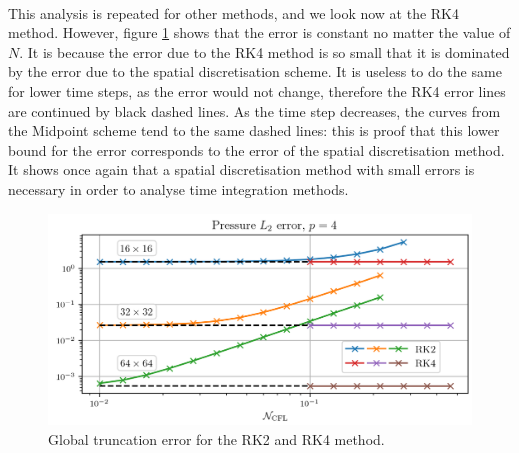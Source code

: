       \paragraph{}
      This analysis is repeated for other methods, and we look now at the RK4 method.
      However, figure \ref{fig:covo_rk2_rk4} shows that the error is constant no matter the value of $N$.
      It is because the error due to the RK4 method is so small that it is dominated by the error due to the spatial discretisation scheme.
      It is useless to do the same for lower time steps, as the error would not change, therefore the RK4 error lines are continued by black dashed lines.
      As the time step decreases, the curves from the Midpoint scheme tend to the same dashed lines: this is proof that this lower bound for the error corresponds to the error of the spatial discretisation method.
      It shows once again that a spatial discretisation method with small errors is necessary in order to analyse time integration methods.

      \begin{figure}
        \centering
        \includegraphics{figures/covo_rk2_rk4.png}
        \caption{Global truncation error for the RK2 and RK4 method.}
        \label{fig:covo_rk2_rk4}
      \end{figure}

